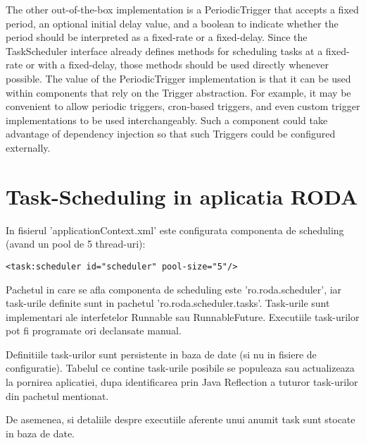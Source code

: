 The other out-of-the-box implementation is a PeriodicTrigger that accepts a fixed period, an optional initial delay value, 
and a boolean to indicate whether the period should be interpreted as a fixed-rate or a fixed-delay. 
Since the TaskScheduler interface already defines methods for scheduling tasks at a fixed-rate or with a fixed-delay, 
those methods should be used directly whenever possible. 
The value of the PeriodicTrigger implementation is that it can be used within components that rely on the Trigger abstraction. 
For example, it may be convenient to allow periodic triggers, cron-based triggers, and even custom trigger implementations to be used interchangeably. 
Such a component could take advantage of dependency injection so that such Triggers could be configured externally.

\section{Task-Scheduling in aplicatia RODA}

In fisierul 'applicationContext.xml' este configurata componenta de scheduling (avand un pool de 5 thread-uri):

\begin{lstlisting}
<task:scheduler id="scheduler" pool-size="5"/>
\end{lstlisting}

Pachetul in care se afla componenta de scheduling este 'ro.roda.scheduler', iar task-urile definite sunt in pachetul 'ro.roda.scheduler.tasks'.
Task-urile sunt implementari ale interfetelor Runnable sau RunnableFuture. 
Executiile task-urilor pot fi programate ori declansate manual.

Definitiile task-urilor sunt persistente in baza de date (si nu in fisiere de configuratie).
Tabelul ce contine task-urile posibile se populeaza sau actualizeaza la pornirea aplicatiei, 
dupa identificarea prin Java Reflection a tuturor task-urilor din pachetul mentionat.

De asemenea, si detaliile despre executiile aferente unui anumit task sunt stocate in baza de date.

